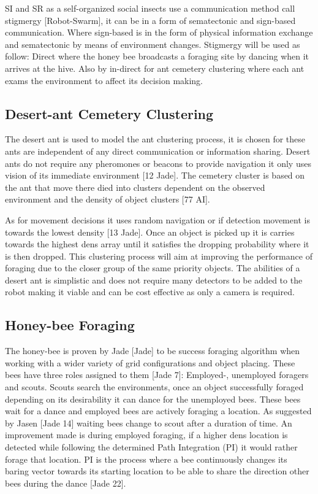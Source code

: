 \documentclass[12pt]{article}
\begin{document}
\par{SI and SR as a self-organized social insects use a communication method call stigmergy [Robot-Swarm], it can be in a form of sematectonic and sign-based communication. Where sign-based is in the form of physical information exchange and sematectonic by means of environment changes. Stigmergy will be used as follow: Direct where the honey bee broadcasts a foraging site by dancing when it arrives at the hive. Also by in-direct for ant cemetery clustering where each ant exams the environment to affect its decision making.}

\subsection{Desert-ant Cemetery Clustering}

\par{The desert ant is used to model the ant clustering process, it is chosen for these ants are independent of any direct communication or information sharing. Desert ants do not require any pheromones or beacons to provide navigation it only uses vision of its immediate environment [12 Jade]. The cemetery cluster is based on the ant that move there died into clusters dependent on the observed environment and the density of object clusters [77 AI].}

\par{As for movement decisions it uses random navigation or if detection movement is towards the lowest density [13 Jade]. Once an object is picked up it is carries towards the highest dens array until it satisfies the dropping probability where it is then dropped.  This clustering process will aim at improving the performance of foraging due to the closer group of the same priority objects. The abilities of a desert ant is simplistic and does not require many detectors to be added to the robot making it viable and can be cost effective as only a camera is required.}

\subsection{Honey-bee Foraging}

\par{The honey-bee is proven by Jade [Jade] to be success foraging algorithm when working with a wider variety of grid configurations and object placing. These bees have three roles assigned to them [Jade 7]: Employed-, unemployed foragers and scouts. Scouts search the environments, once an object successfully foraged depending on its desirability it can dance for the unemployed bees. These bees wait for a dance and employed bees are actively foraging a location. As suggested by Jasen [Jade 14] waiting bees change to scout after a duration of time. An improvement made is during employed foraging, if a higher dens location is detected while following the determined Path Integration (PI) it would rather forage that  location. PI is the process where a bee continuously changes its baring vector towards its starting location to be able to share the direction other bees during the dance [Jade 22].}
\end{document}
